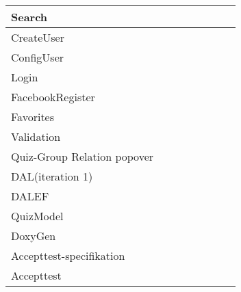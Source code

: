\begin{tabular}{|l|c|c|c|c|c|c|c|}
Search		&\checkmark	&	&	&	& 	&\checkmark	& \\ 
\hline

CreateUser		&	&	&	&	& 	&	&\checkmark	 \\ 
\hline

ConfigUser 		&	&	&	&	& 	&\checkmark	& \\ 
\hline

Login		&	&	&\checkmark	&	& 	&	& \\ 
\hline

FacebookRegister 		&	&	&\checkmark	&	& 	&	& \\ 
\hline

Favorites		&	&	&	&	&\checkmark 	&	& \\ 
\hline

Validation 		&	&	&\checkmark	&	& 	&	& \\ 
\hline

Quiz-Group Relation popover		&	&\checkmark	&	&	& 	&	& \\ 
\hline 

DAL(iteration 1)	&	&	&\checkmark	&	& 	&	& \\ 
\hline 

DALEF		&	&\checkmark	&\checkmark	&\checkmark	& 	&\checkmark	&\checkmark \\ 
\hline 

QuizModel		&	&\checkmark	&\checkmark	&	& 	&\checkmark	& \\ 
\hline 

DoxyGen		&	&	&	&\checkmark	& 	&	& \\ 
\hline 

\rowcolor{Gray}
Accepttest-specifikation		&\multicolumn{7}{c|}{ } \\ 
\hline

Accepttest 		&\checkmark &\checkmark	&\checkmark	&\checkmark	&\checkmark	&\checkmark	&\checkmark \\ 
\hline

\end{tabular} 

%
